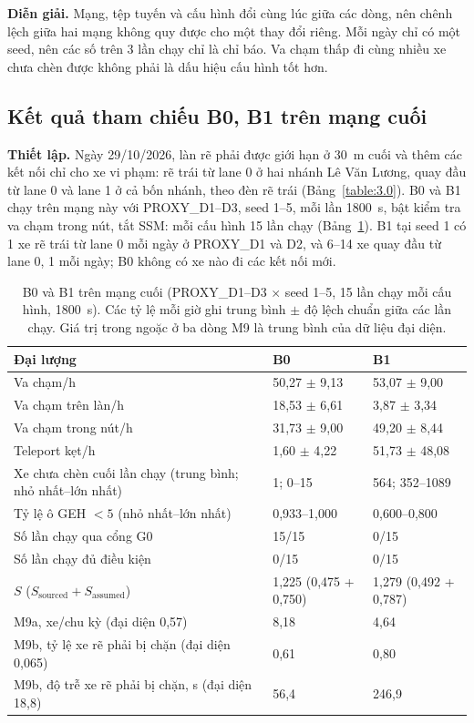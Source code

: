 \documentclass[../DoAn.tex]{subfiles}
\begin{document}
\textbf{Diễn giải.} Mạng, tệp tuyến và cấu hình đổi cùng lúc giữa các dòng, nên chênh lệch giữa hai mạng không quy được cho một thay đổi riêng. Mỗi ngày chỉ có một seed, nên các số trên 3 lần chạy chỉ là chỉ báo. Va chạm thấp đi cùng nhiều xe chưa chèn được không phải là dấu hiệu cấu hình tốt hơn.

\subsection{Kết quả tham chiếu B0, B1 trên mạng cuối}
\label{subsection:ref_n29}

\textbf{Thiết lập.} Ngày 29/10/2026, làn rẽ phải được giới hạn ở 30~m cuối và thêm các kết nối chỉ cho xe vi phạm: rẽ trái từ lane 0 ở hai nhánh Lê Văn Lương, quay đầu từ lane 0 và lane 1 ở cả bốn nhánh, theo đèn rẽ trái (Bảng~\ref{table:3.0}). B0 và B1 chạy trên mạng này với PROXY\_D1--D3, seed 1--5, mỗi lần 1800~s, bật kiểm tra va chạm trong nút, tắt SSM: mỗi cấu hình 15 lần chạy (Bảng~\ref{table:4.ref_n29}). B1 tại seed 1 có 1 xe rẽ trái từ lane 0 mỗi ngày ở PROXY\_D1 và D2, và 6--14 xe quay đầu từ lane 0, 1 mỗi ngày; B0 không có xe nào đi các kết nối mới.

\begin{table}[H]
\centering
\small
\caption{B0 và B1 trên mạng cuối (PROXY\_D1--D3 $\times$ seed 1--5, 15 lần chạy mỗi cấu hình, 1800~s). Các tỷ lệ mỗi giờ ghi trung bình $\pm$ độ lệch chuẩn giữa các lần chạy. Giá trị trong ngoặc ở ba dòng M9 là trung bình của dữ liệu đại diện.}
\label{table:4.ref_n29}
\begin{tabular}{|p{5.7cm}|p{4.0cm}|p{4.0cm}|}
\hline
\textbf{Đại lượng} & \textbf{B0} & \textbf{B1} \\ \hline
Va chạm/h & 50,27 $\pm$ 9,13 & 53,07 $\pm$ 9,00 \\ \hline
Va chạm trên làn/h & 18,53 $\pm$ 6,61 & 3,87 $\pm$ 3,34 \\ \hline
Va chạm trong nút/h & 31,73 $\pm$ 9,00 & 49,20 $\pm$ 8,44 \\ \hline
Teleport kẹt/h & 1,60 $\pm$ 4,22 & 51,73 $\pm$ 48,08 \\ \hline
Xe chưa chèn cuối lần chạy (trung bình; nhỏ nhất--lớn nhất) & 1; 0--15 & 564; 352--1089 \\ \hline
Tỷ lệ ô GEH $<5$ (nhỏ nhất--lớn nhất) & 0,933--1,000 & 0,600--0,800 \\ \hline
Số lần chạy qua cổng G0 & 15/15 & 0/15 \\ \hline
Số lần chạy đủ điều kiện & 0/15 & 0/15 \\ \hline
$S$ ($S_{\text{sourced}} + S_{\text{assumed}}$) & 1,225 (0,475 + 0,750) & 1,279 (0,492 + 0,787) \\ \hline
M9a, xe/chu kỳ (đại diện 0,57) & 8,18 & 4,64 \\ \hline
M9b, tỷ lệ xe rẽ phải bị chặn (đại diện 0,065) & 0,61 & 0,80 \\ \hline
M9b, độ trễ xe rẽ phải bị chặn, s (đại diện 18,8) & 56,4 & 246,9 \\ \hline
\end{tabular}
\end{table}
\end{document}
